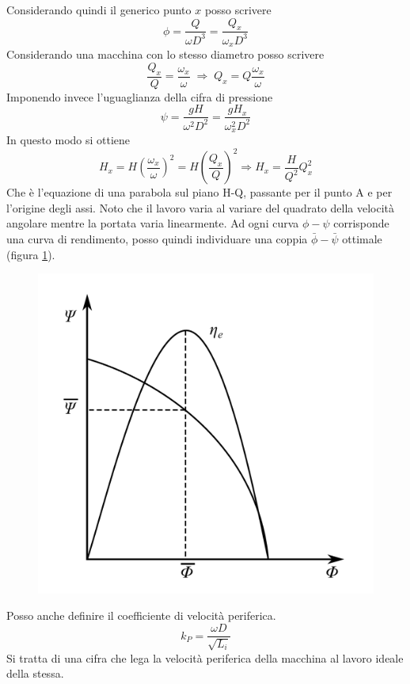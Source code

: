 Considerando quindi il generico punto $x$ posso scrivere
\begin{equation}
\phi = \frac{Q}{\omega D^3}= \frac{Q_x}{\omega_x D^3}
\end{equation}
Considerando una macchina con lo stesso diametro posso scrivere
\begin{equation}
\frac{Q_x}{Q}=\frac{\omega_x}{\omega} \; \Rightarrow \; Q_x = Q \frac{\omega_x}{\omega}
\end{equation}
Imponendo invece l'uguaglianza della cifra di pressione
\begin{equation}
\psi = \frac{gH}{\omega^2 D^2}= \frac{gH_x}{\omega_x^2 D^2}
\end{equation}
In questo modo si ottiene
\begin{equation}
H_x = H(\frac{\omega_x}{\omega})^2 = H(\frac{Q_x}{Q})^2 \Rightarrow H_x = \frac{H}{Q^2}Q_x^2
\end{equation}
Che è l'equazione di una parabola sul piano H-Q, passante per il punto A e per l'origine degli assi. 
Noto che il lavoro varia al variare del quadrato della velocità angolare mentre la portata varia linearmente. 
Ad ogni curva $\phi - \psi$ corrisponde una curva di rendimento, posso quindi individuare una coppia $\bar{\phi} - \bar{\psi}$ ottimale (figura \ref{fig:adim}).
\begin{figure}[h!]
\centering
  \includegraphics[width=.3\textwidth]{fig/adim.pdf}
\caption{}
\label{fig:adim}
\end{figure}
Posso anche definire il coefficiente di velocità periferica.
\begin{equation}
k_P = \frac{\omega D}{\sqrt{L_i}}
\end{equation}
Si tratta di una cifra che lega la velocità periferica della macchina al lavoro ideale della stessa.


